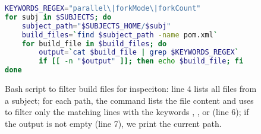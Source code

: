 \begin{figure}[h!]
\centering
\scriptsize
{}
\begin{lstlisting}[language=Bash]
KEYWORDS_REGEX="parallel\|forkMode\|forkCount"
for subj in $SUBJECTS; do
    subject_path="$SUBJECTS_HOME/$subj"
    build_files=`find $subject_path -name pom.xml`
    for build_file in $build_files; do
        output=`cat $build_file | grep $KEYWORDS_REGEX`
        if [[ -n "$output" ]]; then echo $build_file; fi
done
\end{lstlisting}
    \caption{\label{fig:discovery-step} Bash script to filter build
    files for inspeciton: line 4 lists all \pomf{} files from a
    subject; for each path, the   command lists the file
    content and uses  to filter only the matching lines
    with the keywords , , or
     (line 6); if the output is not empty (line
    7), we print the current path.}
\end{figure}
